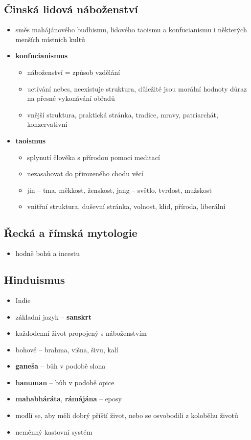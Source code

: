 \subsection{Činská lidová náboženství}
\begin{itemize}
\item směs mahájánového budhismu, lidového taoismu a konfucianismu i některých menších místních kultů
\item \textbf{konfucianismus}
	\begin{itemize}
	\item náboženství = způsob vzdělání
	\item uctívání nebes, neexistuje struktura, důležité jsou morální hodnoty důraz na přesné vykonávání obřadů
	\item vnější struktura, praktická stránka, tradice, mravy, patriarchát, konzervativní
	\end{itemize}
\item \textbf{taoismus}
	\begin{itemize}
	\item splynutí člověka s přírodou pomocí meditací
	\item nezasahovat do přirozeného chodu věcí
	\item jin -- tma, měkkost, ženskost, jang -- světlo, tvrdost, mužskost
	\item vnitřní struktura, duševní stránka, volnost, klid, příroda, liberální
	\end{itemize}
\end{itemize}

\subsection{Řecká a římská mytologie}
\begin{itemize}
\item hodně bohů a incestu
\end{itemize}

\subsection{Hinduismus}
\begin{itemize}
\item Indie
\item základní jazyk -- \textbf{sanskrt}
\item každodenní život propojený s náboženstvím
\item bohové -- brahma, višna, šivu, kalí
\item \textbf{ganeša} -- bůh v podobě slona
\item \textbf{hanuman} -- bůh v podobě opice
\item \textbf{mahabháráta}, \textbf{rámájána} -- eposy
\item modlí se, aby měli dobrý příští život, nebo se osvobodili z koloběhu životů
\item neměnný kastovní systém
\end{itemize}

\newpage


